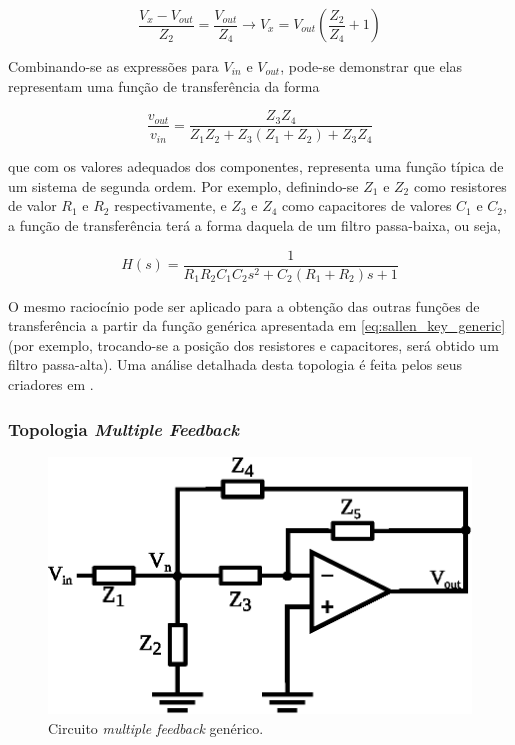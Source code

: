 \begin{equation}
\frac{V_x - V_{out}}{Z_2} = \frac{V_{out}}{Z_4} \rightarrow V_x = V_{out} (\frac{Z_2}{Z_4}+1)
\end{equation}

Combinando-se as expressões para $V_{in}$ e $V_{out}$, pode-se demonstrar que elas representam uma função de transferência da forma 

\begin{equation}
\frac{v_{out}}{v_{in}} = \frac{Z_3 Z_4}{Z_1 Z_2 + Z_3 (Z_1 + Z_2) + Z_3 Z_4}
\label{eq:sallen_key_generic}
\end{equation}

que com os valores adequados dos componentes, representa uma função típica de um sistema de segunda ordem. Por exemplo, definindo-se $Z_1$ e $Z_2$ como resistores de valor $R_1$ e $R_2$ respectivamente, e $Z_3$ e $Z_4$ como capacitores de valores $C_1$ e $C_2$, a função de transferência terá a forma daquela de um filtro passa-baixa, ou seja,

\begin{equation}
H(s) = \frac{1}{R_1 R_2 C_1 C_2 s^2 + C_2 (R_1 + R_2)s + 1}
\end{equation}

O mesmo raciocínio pode ser aplicado para a obtenção das outras funções de transferência a partir da função genérica apresentada em \ref{eq:sallen_key_generic} (por exemplo, trocando-se a posição dos resistores e capacitores, será obtido um filtro passa-alta). Uma análise detalhada desta topologia é feita pelos seus criadores em \cite{sallen}.

\subsubsection{Topologia \textit{Multiple Feedback}}
\begin{figure}[H]
  \centering
  \includegraphics{images/mfb_generic}
  \caption{Circuito \textit{multiple feedback} genérico.}
  \label{fig:mfb_generic}
\end{figure}

